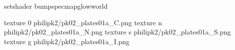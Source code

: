 setshader bumpspecmapglowworld

texture 0 philipk2/pk02_plates01a_C.png
texture n philipk2/pk02_plates01a_N.png
texture s philipk2/pk02_plates01a_S.png
texture g philipk2/pk02_plates01a_I.png

